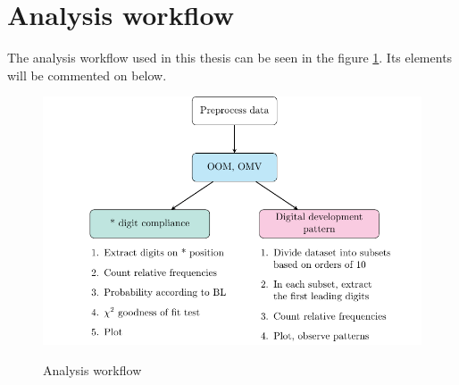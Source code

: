 





\newpage

\section{Analysis workflow}

The analysis workflow used in this thesis can be seen in the figure \ref{fig:analysis-workflow}.  Its elements will be commented on below. 

\begin{figure}[h]
    \centering
    \caption{Analysis workflow}
    \includegraphics[width=0.9\linewidth]{BT-DT-eng/TemplateBT-DT/img/diagram.pdf}
    \label{fig:analysis-workflow}
\end{figure}

